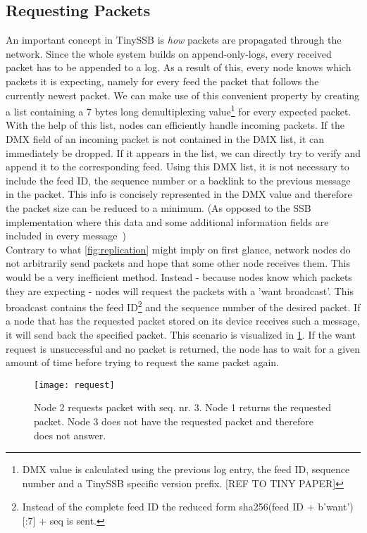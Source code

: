 \subsection{Requesting Packets}
An important concept in TinySSB is \textit{how} packets are propagated through the network. Since the whole system builds on append-only-logs, every received packet has to be appended to a log. As a result of this, every node knows which packets it is expecting, namely for every feed the packet that follows the currently newest packet. We can make use of this convenient property by creating a list containing a 7 bytes long demultiplexing value\footnote{DMX value is calculated using the previous log entry, the feed ID, sequence number and a TinySSB specific version prefix. [REF TO TINY PAPER]} for every expected packet. With the help of this list, nodes can efficiently handle incoming packets. If the DMX field of an incoming packet is not contained in the DMX list, it can immediately be dropped. If it appears in the list, we can directly try to verify and append it to the corresponding feed. Using this DMX list, it is not necessary to include the feed ID, the sequence number or a backlink to the previous message in the packet. This info is concisely represented in the DMX value and therefore the packet size can be reduced to a minimum. (As opposed to the SSB implementation where this data and some additional information fields are included in every message~\cite{10.1145/3357150.3357396}) \\
Contrary to what \cref{fig:replication} might imply on first glance, network nodes do not arbitrarily send packets and hope that some other node receives them. This would be a very inefficient method. Instead - because nodes know which packets they are expecting - nodes will request the packets with a 'want broadcast'. This broadcast contains the feed ID\footnote{Instead of the complete feed ID the reduced form sha256(feed ID + b'want')[:7] + seq is sent.} and the sequence number of the desired packet. If a node that has the requested packet stored on its device receives such a message, it will send back the specified packet. This scenario is visualized in \cref{fig:request}. If the want request is unsuccessful and no packet is returned, the node has to wait for a given amount of time before trying to request the same packet again.

\begin{figure}
\centering
\texttt{[image: request]}
\caption{Node 2 requests packet with seq. nr. 3. Node 1 returns the requested packet. Node 3 does not have the requested packet and therefore does not answer.}
\label{fig:request}
\end{figure}

